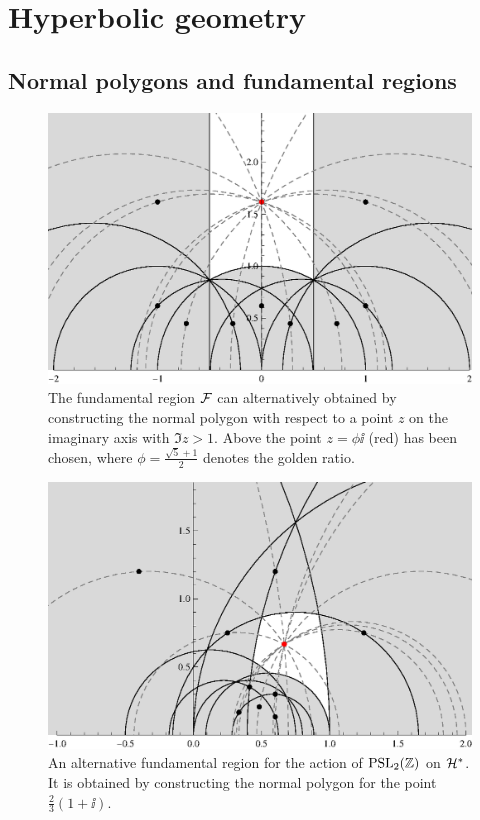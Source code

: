 \section{Hyperbolic geometry}

\subsection{Normal polygons and fundamental regions}


\begin{figure}
\centering
\includegraphics[width=\textwidth]{figures/normpoly-fundom-1}
\caption[The fundamental region $\FunDom$ as normal polygon]{The fundamental region $\FunDom$ can alternatively obtained by constructing the normal polygon with respect to a point $z$ on the imaginary axis with $\Im{z} > 1$. Above the point $z = \phi \ii$ (red) has been chosen, where $\phi = \frac{\sqrt{5}+1}{2}$ denotes the golden ratio.}
\label{fig_NormalPolyFunDom}
\end{figure}

\begin{figure}
\centering
\includegraphics[width=\textwidth]{figures/normpoly-fundom-2}
\caption[An alternative fundamental region for $\PSL{\Z}$]{An alternative fundamental region for the action of $\PSL{\Z}$ on $\mathcal{H}^\ast$. It is obtained by constructing the normal polygon for the point $\frac{2}{3}(1+\ii)$.}
\label{fig_AltNormalPolyFunDom}
\end{figure}

